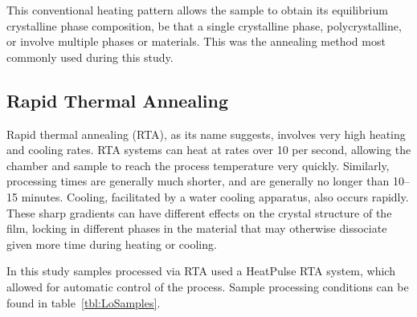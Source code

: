 This conventional heating pattern allows the sample to obtain its equilibrium crystalline phase composition, be that a single crystalline phase, polycrystalline, or involve multiple phases or materials. This was the annealing method most commonly used during this study. 


\subsection{Rapid Thermal Annealing}

Rapid thermal annealing (RTA), as its name suggests, involves very high heating and cooling rates. RTA systems can heat at rates over 10\degC{} per second, allowing the chamber and sample to reach the process temperature very quickly. Similarly, processing times are generally much shorter, and are generally no longer than 10--15 minutes. Cooling, facilitated by a water cooling apparatus, also occurs rapidly. These sharp gradients can have different effects on the crystal structure of the film, locking in different phases in the material that may otherwise dissociate given more time during heating or cooling. 

In this study samples processed via RTA used a HeatPulse\textsuperscript{\texttrademark} RTA system, which allowed for automatic control of the process. Sample processing conditions can be found in table~\vref{tbl:LoSamples}. 





